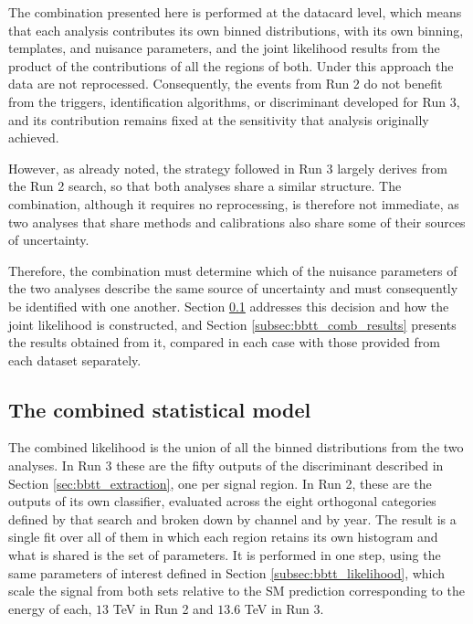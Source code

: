 The combination presented here is performed at the datacard level, which means that each analysis contributes its own binned distributions, with its own binning, templates, and nuisance parameters, and the joint likelihood results from the product of the contributions of all the regions of both. Under this approach the data are not reprocessed. Consequently, the events from Run 2 do not benefit from the triggers, identification algorithms, or discriminant developed for Run 3, and its contribution remains fixed at the sensitivity that analysis originally achieved.

However, as already noted, the strategy followed in Run 3 largely derives from the Run 2 search, so that both analyses share a similar structure. The combination, although it requires no reprocessing, is therefore not immediate, as two analyses that share methods and calibrations also share some of their sources of uncertainty.

Therefore, the combination must determine which of the nuisance parameters of the two analyses describe the same source of uncertainty and must consequently be identified with one another. Section \ref{subsec:bbtt_comb_procedure} addresses this decision and how the joint likelihood is constructed, and Section \ref{subsec:bbtt_comb_results} presents the results obtained from it, compared in each case with those provided from each dataset separately.


\subsection{The combined statistical model}
\label{subsec:bbtt_comb_procedure}
%
The combined likelihood is the union of all the binned distributions from the two analyses. In Run 3 these are the fifty outputs of the discriminant described in Section \ref{sec:bbtt_extraction}, one per signal region. In Run 2, these are the outputs of its own classifier, evaluated across the eight orthogonal categories defined by that search and broken down by channel and by year. The result is a single fit over all of them in which each region retains its own histogram and what is shared is the set of parameters. It is performed in one step, using the same parameters of interest defined in Section \ref{subsec:bbtt_likelihood}, which scale the signal from both sets relative to the SM prediction corresponding to the energy of each, $13$ TeV in Run 2 and $13.6$ TeV in Run 3.\medskip


